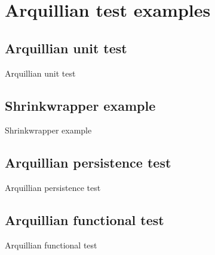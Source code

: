 \section[Examples]{Arquillian test examples}

\subsection[Unit test]{Arquillian unit test}
\begin{frame}{Arquillian unit test}
  

\end{frame}

\subsection[Shrinkwrapper]{Shrinkwrapper example}
\begin{frame}{Shrinkwrapper example}
  

\end{frame}
\subsection[Persistence test]{Arquillian persistence test}
\begin{frame}{Arquillian persistence test}
\end{frame}
\subsection[Functional test]{Arquillian functional test}
\begin{frame}{Arquillian functional test}
\end{frame}

